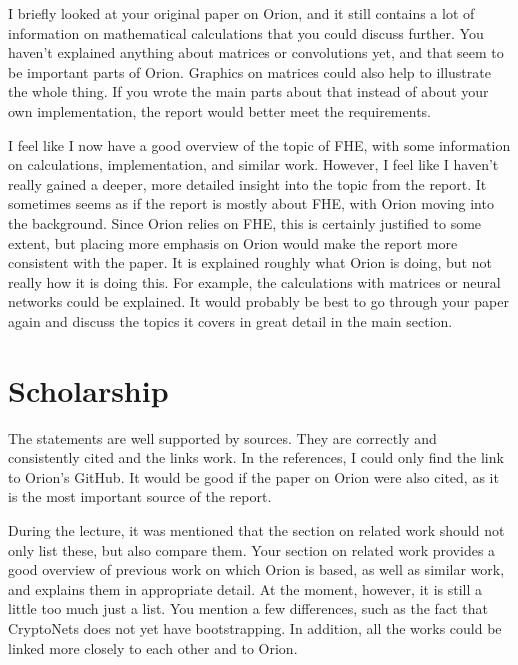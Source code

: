 \documentclass[a4paper]{article}
\begin{document}
I briefly looked at your original paper on Orion, and it still contains a lot of information on mathematical calculations that you could discuss further. You haven't explained anything about matrices or convolutions yet, and that seem to be important parts of Orion. Graphics on matrices could also help to illustrate the whole thing. If you wrote the main parts about that instead of about your own implementation, the report would better meet the requirements. 

I feel like I now have a good overview of the topic of FHE, with some information on calculations, implementation, and similar work. However, I feel like I haven't really gained a deeper, more detailed insight into the topic from the report. It sometimes seems as if the report is mostly about FHE, with Orion moving into the background. Since Orion relies on FHE, this is certainly justified to some extent, but placing more emphasis on Orion would make the report more consistent with the paper. It is explained roughly what Orion is doing, but not really how it is doing this. For example, the calculations with matrices or neural networks could be explained. It would probably be best to go through your paper again and discuss the topics it covers in great detail in the main section.

\section{Scholarship} %
The statements are well supported by sources. They are correctly and consistently cited and the links work. In the references, I could only find the link to Orion's GitHub. It would be good if the paper on Orion were also cited, as it is the most important source of the report.

During the lecture, it was mentioned that the section on related work should not only list these, but also compare them. Your section on related work provides a good overview of previous work on which Orion is based, as well as similar work, and explains them in appropriate detail. At the moment, however, it is still a little too much just a list. You mention a few differences, such as the fact that CryptoNets does not yet have bootstrapping. In addition, all the works could be linked more closely to each other and to Orion. 
\end{document}
